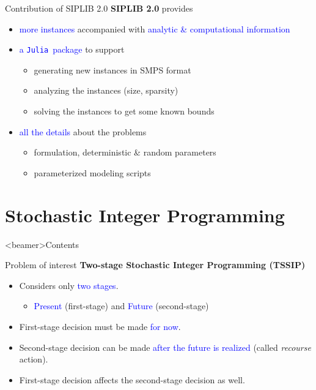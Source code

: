 \documentclass{beamer}
\newcommand{\siplibtwo}{\textsf{SIPLIB 2.0}}
\newcommand{\julia}{\texttt{Julia}}
\begin{document}
\begin{frame}{Contribution of \siplibtwo}
\textbf{\siplibtwo} provides
\begin{itemize}
\item \textcolor{blue}{more instances} accompanied with \textcolor{blue}{analytic \& computational information}
\item \textcolor{blue}{a \julia\ package} to support
\begin{itemize}
\item generating new instances in SMPS format
\item analyzing the instances (size, sparsity)
\item solving the instances to get some known bounds
\end{itemize}
\item \textcolor{blue}{all the details} about the problems
\begin{itemize}
\item formulation, deterministic \& random parameters
\item parameterized modeling scripts
\end{itemize}
\end{itemize}
\end{frame}

\section{Stochastic Integer Programming}

\begin{frame}<beamer>{Contents}
\end{frame}

\begin{frame}{Problem of interest}
\textbf{{Two-stage Stochastic Integer Programming (TSSIP)}}
\begin{itemize}
\item Considers only \textcolor{blue}{two stages}.
\begin{itemize}
\item \textcolor{blue}{Present} (first-stage) and \textcolor{blue}{Future} (second-stage)
\end{itemize} 
\item First-stage decision must be made \textcolor{blue}{for now}.
\item Second-stage decision can be made \textcolor{blue}{after the future is realized} (called \textit{recourse} action).
\item First-stage decision affects the second-stage decision as well.
\end{itemize}
\end{frame}
\end{document}
